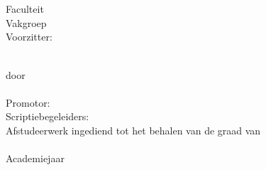 \begin{titlepage}
\renewcommand{\baselinestretch}{1.1}
\Large
\begin{center}
\mbox{}\\[0cm]%
\unitlength 1mm

\epsfysize 4cm \epsfclipon{}\\
{\Large 
Faculteit \faculteit\\
Vakgroep \vakgroep\\
Voorzitter: \voorzitter
}\\\vfill
\parbox{14 cm}{
{\Huge\bfseries
\begin{center}
\sf\titel
\end{center}
}
}\\\vfill
door\\ 
{\LARGE \auteur}\\[3.3cm]
Promotor: \promotor \\
Scriptiebegeleiders: \begeleider 
\\\vfill
Afstudeerwerk ingediend tot het behalen van de graad van\\
\richting\\[1cm]
Academiejaar \jaar
\end{center}
\renewcommand{\baselinestretch}{1}
\end{titlepage}





